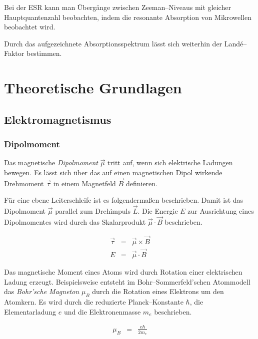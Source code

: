 \documentclass[12pt,a4paper]{scrartcl}
\numberwithin{equation}{section} %
\begin{document}
Bei der ESR kann man Übergänge zwischen Zeeman--Niveaus mit gleicher Hauptquantenzahl beobachten, indem die resonante Absorption von Mikrowellen beobachtet wird.

Durch das aufgezeichnete Absorptionsspektrum lässt sich weiterhin der Landé--Faktor bestimmen.

\clearpage
\hypertarget{theoretische-grundlagen}{\section{Theoretische Grundlagen}\label{theoretische-grundlagen}}

\hypertarget{elektromagnetismus}{\subsection{Elektromagnetismus}\label{elektromagnetismus}}

\hypertarget{dipolmoment}{\subsubsection{Dipolmoment}\label{dipolmoment}}

Das magnetische \emph{Dipolmoment} $\vec \mu$ tritt auf, wenn sich elektrische Ladungen bewegen. Es lässt sich über das auf einen magnetischen Dipol wirkende Drehmoment $\vec \tau$ in einem Magnetfeld $\vec B$ definieren.

Für eine ebene Leiterschleife ist es folgendermaßen beschrieben. \cite{Jackson} Damit ist das Dipolmoment $\vec \mu$ parallel zum Drehimpuls $\vec{L}$. Die Energie $E$ zur Ausrichtung eines Dipolmomentes wird durch das Skalarprodukt $\vec \mu \cdot \vec B$ beschrieben.

\begin{eqnarray}
	\vec \tau &=& \vec \mu \times \vec B \\
	E &=& \vec \mu \cdot \vec B \label{eq:EDipol}
\end{eqnarray}

\noindent
Das magnetische Moment eines Atoms wird durch Rotation einer elektrischen Ladung erzeugt. Beispielsweise entsteht im Bohr--Sommerfeld'schen Atommodell das \emph{Bohr'sche Magneton} $\mu_B$ durch die Rotation eines Elektrons um den Atomkern. Es wird durch die reduzierte Planck--Konstante $\hbar$, die Elementarladung $e$ und die Elektronenmasse $m_e$ beschrieben.

\begin{eqnarray}
	\mu_B &=& \frac{e\hbar}{2m_e}
\end{eqnarray}
\end{document}
